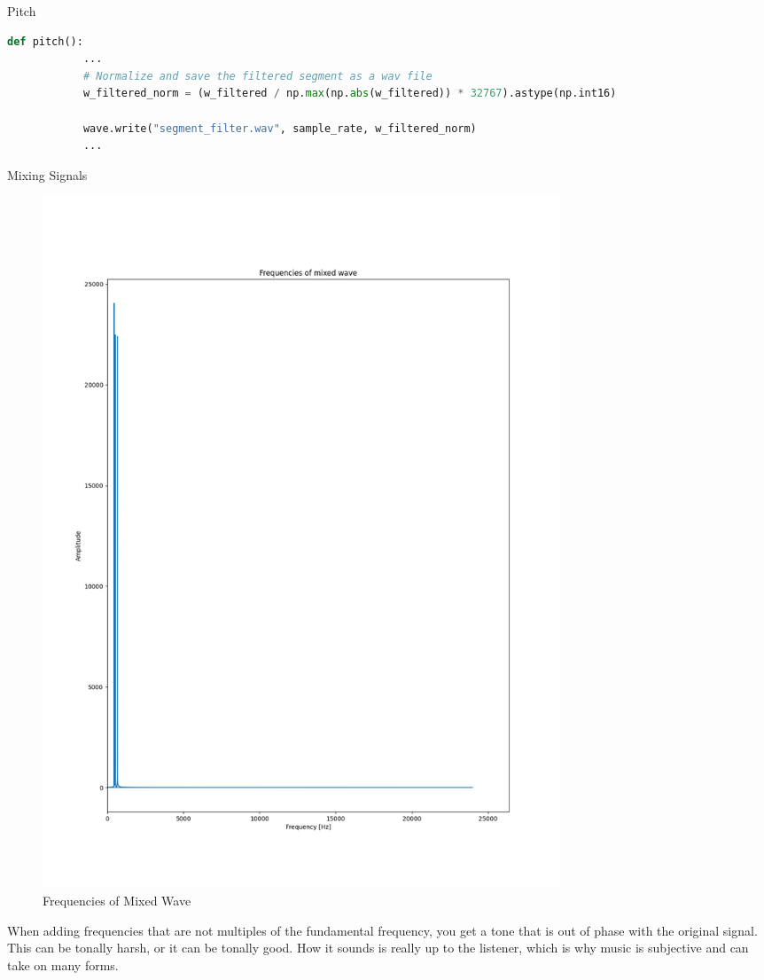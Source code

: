 \begin{hwkProblem}{6.2}{Pitch}
	\newpage
	\solpart

	\begin{lstlisting}[language=python]
		def pitch():
			...
			# Normalize and save the filtered segment as a wav file
			w_filtered_norm = (w_filtered / np.max(np.abs(w_filtered)) * 32767).astype(np.int16)

			wave.write("segment_filter.wav", sample_rate, w_filtered_norm)
			...
	\end{lstlisting}

\end{hwkProblem}

\begin{hwkProblem}{6.3}{Mixing Signals}
	\solution

	\begin{figure}[ht!]
	  \centering
	  \includegraphics[width=0.75\textwidth]{./6.3.png}
	  \caption{Frequencies of Mixed Wave}
	\end{figure}

	When adding frequencies that are not multiples of the fundamental frequency, you get a tone that is out of phase with the original signal. This can be tonally harsh, or it can be tonally good. How it sounds is really up to the listener, which is why music is subjective and can take on many forms.
	
\end{hwkProblem}

